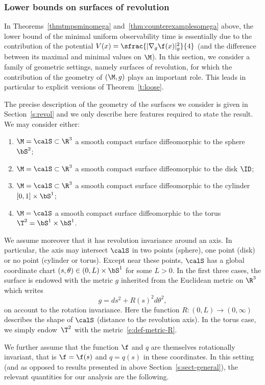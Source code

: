 \subsubsection{Lower bounds on surfaces of revolution}
\label{s:revol-intro}
In Theorems~\ref{thmtmpsminomega} and~\ref{thm:counterexamplesomega} above, the lower bound of the minimal uniform observability time is essentially due to the contribution of the potential $V(x) = \sfrac{|\nabla_g \f(x)|_g^2}{4}$ (and the difference between its maximal and minimal values on $\M$).
In this section, we consider a family of geometric settings, namely surfaces of revolution, for which the contribution of the geometry of $(\M,g)$ plays an important role.
This leads in particular to explicit versions of Theorem~\ref{t:loose}.

The precise description of the geometry of the surfaces we consider is given in Section~\ref{s:revol} and we only describe here features required to state the result.
We may consider either:
\begin{enumerate}
\item $\M =\calS \subset \R^3$ a smooth compact surface diffeomorphic to the sphere $\bS^2$;
\item $\M =\calS \subset \R^3$ a smooth compact surface diffeomorphic to the disk $\ID$;
\item $\M =\calS \subset \R^3$ a smooth compact surface diffeomorphic to the cylinder $[0,1]\times \bS^1$;
\item $\M =\calS$ a smooth compact surface diffeomorphic to the torus $\T^2 = \bS^1\times \bS^1$.
\end{enumerate}
We assume moreover that it has revolution invariance around an axis. In particular, the axis may intersect $\calS$ in two points (sphere), one point (disk) or no point (cylinder or torus). Except near these points, $\calS$ has a global coordinate chart $(s,\theta)\in(0,L)\times \bS^1$ for some $L>0$.
In the first three cases, the surface is endowed with the metric $g$ inherited from the Euclidean metric on $\R^3$ which writes
\begin{equation}
\label{e:def-metric-R}
g = ds^2 +R(s)^2 d\theta^2,
\end{equation}
on account to the rotation invariance.
Here the function $R:(0,L)\to (0,\infty)$ describes the shape of $\calS$ (distance to the revolution axis).
In the torus case, we simply endow~$\T^2$ with the metric~\eqref{e:def-metric-R}.

We further assume that the function $\f$ and $q$ are themselves rotationally invariant, that is $\f=\f(s)$ and $q=q(s)$ in these coordinates.
In this setting (and as opposed to results presented in above Section~\ref{s:sect-general}), the relevant quantities for our analysis are the following.

